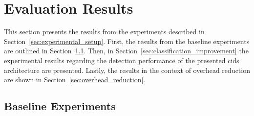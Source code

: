 \documentclass[../../main.tex]{subfiles}
\begin{document}
\section{Evaluation Results}

This section presents the results from the experiments described in Section~\ref{sec:experimental_setup}. First, the results from the baseline experiments are outlined in Section~\ref{sec:baseline}. Then, in Section~\ref{sec:classification_improvement} the experimental results regarding the detection performance of the presented \gls{cids} architecture are presented. Lastly, the results in the context of overhead reduction are shown in Section~\ref{sec:overhead_reduction}.

\subsection{Baseline Experiments}\label{sec:baseline}
\end{document}
